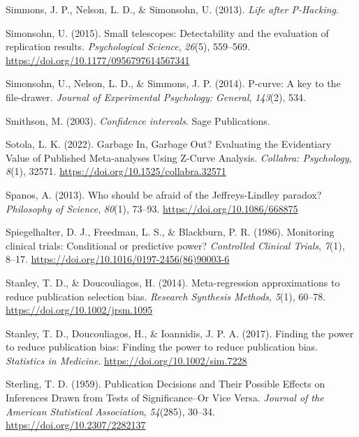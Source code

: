 \documentclass[
  letterpaper,
  DIV=11,
  numbers=noendperiod]{scrreprt}
\newlength{\cslhangindent}
\newlength{\cslentryspacingunit} %
\newenvironment{CSLReferences}[2] %
 {%
  \setlength{\parindent}{0pt}
  \ifodd #1
  \let\oldpar\par
  \def\par{\hangindent=\cslhangindent\oldpar}
  \fi
  \setlength{\parskip}{#2\cslentryspacingunit}
 }%
 {}
\begin{document}
\begin{CSLReferences}{1}{0}
\leavevmode{}%
Simmons, J. P., Nelson, L. D., \& Simonsohn, U. (2013). \emph{Life after
{P-Hacking}}.

\leavevmode{}%
Simonsohn, U. (2015). Small telescopes: {Detectability} and the
evaluation of replication results. \emph{Psychological Science},
\emph{26}(5), 559--569. \url{https://doi.org/10.1177/0956797614567341}

\leavevmode{}%
Simonsohn, U., Nelson, L. D., \& Simmons, J. P. (2014). P-curve: {A} key
to the file-drawer. \emph{Journal of Experimental Psychology: General},
\emph{143}(2), 534.

\leavevmode{}%
Smithson, M. (2003). \emph{Confidence intervals}. {Sage Publications}.

\leavevmode{}%
Sotola, L. K. (2022). Garbage {In}, {Garbage Out}? {Evaluating} the
{Evidentiary Value} of {Published Meta-analyses Using Z-Curve Analysis}.
\emph{Collabra: Psychology}, \emph{8}(1), 32571.
\url{https://doi.org/10.1525/collabra.32571}

\leavevmode{}%
Spanos, A. (2013). Who should be afraid of the {Jeffreys-Lindley}
paradox? \emph{Philosophy of Science}, \emph{80}(1), 73--93.
\url{https://doi.org/10.1086/668875}

\leavevmode{}%
Spiegelhalter, D. J., Freedman, L. S., \& Blackburn, P. R. (1986).
Monitoring clinical trials: Conditional or predictive power?
\emph{Controlled Clinical Trials}, \emph{7}(1), 8--17.
\url{https://doi.org/10.1016/0197-2456(86)90003-6}

\leavevmode{}%
Stanley, T. D., \& Doucouliagos, H. (2014). Meta-regression
approximations to reduce publication selection bias. \emph{Research
Synthesis Methods}, \emph{5}(1), 60--78.
\url{https://doi.org/10.1002/jrsm.1095}

\leavevmode{}%
Stanley, T. D., Doucouliagos, H., \& Ioannidis, J. P. A. (2017). Finding
the power to reduce publication bias: {Finding} the power to reduce
publication bias. \emph{Statistics in Medicine}.
\url{https://doi.org/10.1002/sim.7228}

\leavevmode{}%
Sterling, T. D. (1959). Publication {Decisions} and {Their Possible
Effects} on {Inferences Drawn} from {Tests} of {Significance--Or Vice
Versa}. \emph{Journal of the American Statistical Association},
\emph{54}(285), 30--34. \url{https://doi.org/10.2307/2282137}


\end{CSLReferences}
\end{document}
